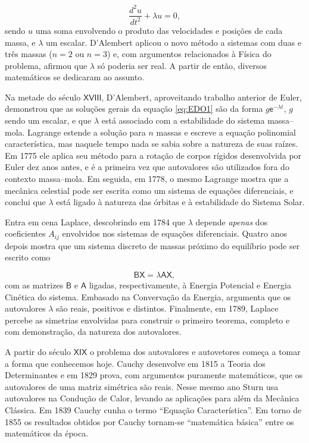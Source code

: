 \begin{equation}\label{eq:EDO1}
	\frac{d^2u}{dt^2} + \lambda u = 0,
\end{equation}
sendo $u$ uma soma envolvendo o produto das velocidades e posições de cada massa, e $\lambda$ um escalar. D'Alembert aplicou o novo método a sistemas com duas e três massas ($n = 2$ ou $n = 3$) e, com argumentos relacionados à Física do problema, afirmou que $\lambda$ só poderia ser real. A partir de então, diversos matemáticos se dedicaram ao assunto.

	Na metade do século $\mathsf{XVIII}$, D'Alembert, aproveitando trabalho anterior de Euler, demonstrou que as soluções gerais da equação \ref{eq:EDO1} são da forma $g\mathsf{e}^{-\lambda t}$, $g$ sendo um escalar, e que $\lambda$ está associado com a estabilidade do sistema massa--mola. Lagrange estende a solução para $n$ massas e escreve a equação polinomial característica, mas naquele tempo nada se sabia sobre a natureza de suas raízes. Em 1775 ele aplica seu método para a rotação de corpos rígidos desenvolvida por Euler dez anos antes, e é a primeira vez que autovalores são utilizados fora do contexto massa--mola. Em seguida, em 1778, o mesmo Lagrange mostra que a mecânica celestial pode ser escrita como um sistema de equações diferenciais, e conclui que $\lambda$ está ligado à natureza das órbitas e à estabilidade do Sistema Solar.
	
	Entra em cena Laplace, descobrindo em 1784 que $\lambda$ depende \emph{apenas} dos coeficientes $A_{ij}$ envolvidos nos sistemas de equações diferenciais. Quatro anos depois mostra que um sistema discreto de massas próximo do equilíbrio pode ser escrito como 
	
	\begin{equation}
		\mathsf{B}\mathsf{X} = \lambda \mathsf{A}\mathsf{X},
	\end{equation}
	com as matrizes $\mathsf{B}$ e $\mathsf{A}$ ligadas, respectivamente, à Energia Potencial e Energia Cinética do sistema. Embasado na Convervação da Energia, argumenta que os autovalores $\lambda$ são reais, positivos e distintos. Finalmente, em 1789, Laplace percebe as simetrias envolvidas para construir o primeiro teorema, completo e com demonstração, da natureza dos autovalores.
	
	A partir do século $\mathsf{XIX}$ o problema dos autovalores e autovetores começa a tomar a forma que conhecemos hoje. Cauchy desenvolve em 1815 a Teoria dos Determinantes e em 1829 prova, com argumentos puramente matemáticos, que os autovalores de uma matriz simétrica são reais. Nesse mesmo ano Sturn usa autovalores na Condução de Calor, levando as aplicações para além da Mecânica Clássica. Em 1839 Cauchy cunha o termo ``Equação Característica''. Em torno de 1855 os resultados obtidos por Cauchy tornam-se ``matemática básica'' entre os matemáticos da época.
	
